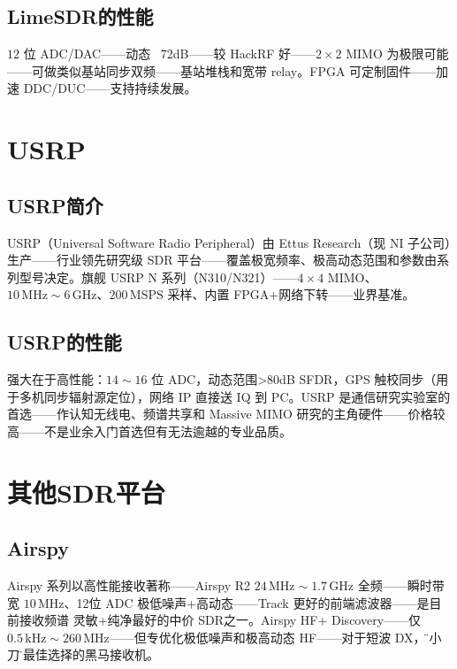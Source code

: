 \documentclass[12pt,UTF8]{ctexbook}
\begin{document}
\subsection{LimeSDR的性能}

$12$ 位 ADC/DAC——动态 ~72dB——较 HackRF 好——$2\times2$ MIMO 为极限可能——可做类似基站同步双频——基站堆栈和宽带 relay。FPGA 可定制固件——加速 DDC/DUC——支持持续发展。

\section{USRP}
\label{sec:usrp}

\subsection{USRP简介}

USRP（Universal Software Radio Peripheral）由 Ettus Research（现 NI 子公司）生产——行业领先研究级 SDR 平台——覆盖极宽频率、极高动态范围和参数由系列型号决定。旗舰 USRP N 系列（N310/N321）——$4\times4$ MIMO、$10\,\mathrm{MHz}\sim6\,\mathrm{GHz}$、$200\,\mathrm{MSPS}$ 采样、内置 FPGA+网络下转——业界基准。

\subsection{USRP的性能}

强大在于高性能：$14\sim16$ 位 ADC，动态范围>80dB SFDR，GPS 触校同步（用于多机同步辐射源定位），网络 IP 直接送 IQ 到 PC。USRP 是通信研究实验室的首选——作认知无线电、频谱共享和 Massive MIMO 研究的主角硬件——价格较高——不是业余入门首选但有无法逾越的专业品质。

\section{其他SDR平台}
\label{sec:other_sdr}

\subsection{Airspy}

Airspy 系列以高性能接收著称——Airspy R2 $24\,\mathrm{MHz}\sim1.7\,\mathrm{GHz}$ 全频——瞬时带宽 $10\,\mathrm{MHz}$、12位 ADC 极低噪声+高动态——Track 更好的前端滤波器——是目前接收频谱 灵敏+纯净最好的中价 SDR之一。Airspy HF+ Discovery——仅 $0.5\,\mathrm{kHz}\sim260\,\mathrm{MHz}$——但专优化极低噪声和极高动态 HF——对于短波 DX，\"这小刀\"是最佳选择的黑马接收机。
\end{document}
